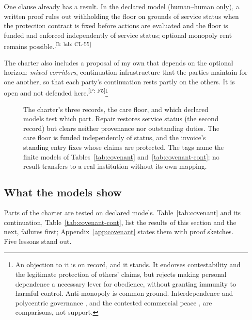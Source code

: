 \documentclass[pdflatex,sn-basic]{sn-jnl}%
\newcommand{\slot}[1]{}%
\newcommand{\claim}[2]{\ifannotated\textsuperscript{\textcolor{blue!60!black}{\tiny[#1: #2]}}\fi}
\begin{document}
One clause already has a result. In the declared model (human--human only), a written proof rules out withholding the floor on grounds of service status when the protection contract is fixed before actions are evaluated and the floor is funded and enforced independently of service status; optional monopoly rent remains possible.\claim{B: lab}{CL-55}

The charter also includes a proposal of my own that depends on the optional horizon: \emph{mixed corridors}, continuation infrastructure that the parties maintain for one another, so that each party's continuation rests partly on the others. It is open and not defended here.\claim{P}{F5}\footnote{An objection to it is on record, and it stands. It endorses contestability and the legitimate protection of others' claims, but rejects making personal dependence a necessary lever for obedience, without granting immunity to harmful control. Anti-monopoly is common ground. Interdependence and polycentric governance \citep{keohane1977,ostrom1990}, and the contested commercial peace \citep{oneal1999}, are comparisons, not support.}

\begin{figure}[tbp]
  \centering
  
  \caption{The charter's three records, the care floor, and which declared models test which part. Repair restores service status (the second record) but clears neither provenance nor outstanding duties. The care floor is funded independently of status, and the invoice's standing entry fixes whose claims are protected. The tags name the finite models of Tables~\ref{tab:covenant} and~\ref{tab:covenant-cont}; no result transfers to a real institution without its own mapping.}
  \label{fig:three-records}
\end{figure}

\subsection{What the models show}\label{sec:covenant-models}

\slot{8.3}
Parts of the charter are tested on declared models. Table~\ref{tab:covenant} and its continuation, Table~\ref{tab:covenant-cont}, list the results of this section and the next, failures first; Appendix~\ref{app:covenant} states them with proof sketches. Five lessons stand out.
\end{document}

